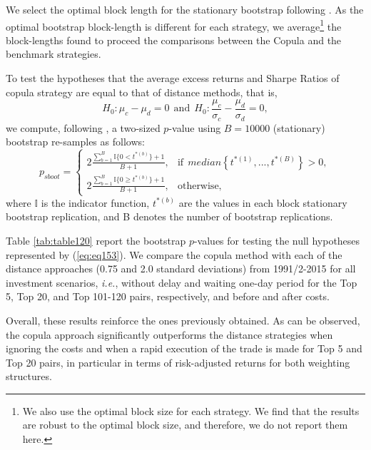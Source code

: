 \documentclass[a4paper]{article}
\begin{document}
	We select the optimal block length for the stationary bootstrap following \citet*{pw04}. As the optimal bootstrap block-length is different for each strategy, we average\footnote{We also use the optimal block size for each strategy. We find that the results are robust to the optimal block size, and therefore, we do not report them here.} the block-lengths found to proceed the comparisons between the Copula and the benchmark strategies.
	
	To test the hypotheses that the average excess returns and Sharpe Ratios of copula strategy are equal to that of distance methods, that is,
	\begin{equation}
	H_{0}:\mu_{c}-\mu_{d}=0  \ \ \textrm{and}
	\ \  H_{0}:\frac{\mu_{c}}{\sigma_{c}}-\frac{\mu_{d}}{\sigma_{d}}=0,
	\label{eq:eq153}
	\end{equation}
	we compute, following \citet*{davison1997}, a two-sized $p$-value using $B=10000$ (stationary) bootstrap re-samples as follows:
	\begin{equation}
	p_{sboot}=
	\begin{cases}
	2\frac{\sum_{b=1}^{B}\mathbb{I}\{0< t^{\ast(b)}\}+1}{B+1}, &\text{if} ~~median\left\{ t^{\ast \left( 1\right) },...,t^{\ast \left( B\right)}\right\} > 0, \\
	2\frac{\sum_{b=1}^{B}\mathbb{I}\{0\geq t^{\ast(b)}\}+1}{B+1}, &\text{otherwise},
	\end{cases}
	\label{eq:eq152}
	\end{equation}
	where $\mathbb{I}$ is the indicator function, $t^{\ast(b)}$ are the values in each block stationary bootstrap replication, and B denotes the number of bootstrap replications.
	
	Table \ref{tab:table120} report the bootstrap $p$-values for testing the null hypotheses represented by (\ref{eq:eq153}). We compare the copula method with each of the distance approaches (0.75 and 2.0 standard deviations) from 1991/2-2015 for all investment scenarios, \emph{i.e.}, without delay and waiting one-day period for the Top 5, Top 20, and Top 101-120 pairs, respectively, and before and after costs.
	
	Overall, these results reinforce the ones previously obtained. As can be observed, the copula approach significantly outperforms the distance strategies when ignoring the costs and when a rapid execution of the trade is made for Top 5 and Top 20 pairs, in particular in terms of risk-adjusted returns for both weighting structures.

	
\end{document}
